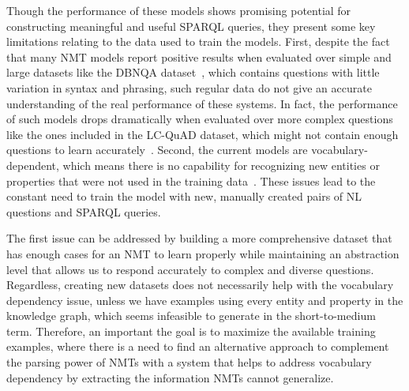 Though the performance of these models shows promising potential for constructing meaningful 
and useful SPARQL queries, they present some key limitations relating to the data 
used to train the models. First, despite the fact that many NMT models report positive results 
when evaluated over simple and large datasets like the DBNQA dataset~\cite{nmt:nl-to-sparql-Yin19}, which 
contains questions with little variation in syntax and phrasing, such regular data do not give an accurate 
understanding of the real performance of these systems. In fact, the performance of such models drops 
dramatically when evaluated over more complex questions like the ones included in the LC-QuAD 
dataset, which might not contain enough questions to learn accurately~\cite{nmt:nl-to-sparql-Yin19}. Second, 
the current models are vocabulary-dependent, which means there is no capability for recognizing 
new entities or properties that were not used in the training data~\cite{nmt:nl-to-sparql-Yin19}. These issues lead 
to the constant need to train the model with new, manually created pairs of NL questions 
and SPARQL queries.

The first issue can be addressed by building a more comprehensive dataset that has enough 
cases for an NMT to learn properly while maintaining an abstraction level that allows us to 
respond accurately to complex and diverse questions. Regardless, creating new datasets does 
not necessarily help with the vocabulary dependency issue, unless we have examples using 
every entity and property in the knowledge graph, which seems infeasible to generate in the 
short-to-medium term. Therefore, an important the goal is to maximize the available training examples, 
where there is a need to find an alternative approach to complement the parsing power 
of NMTs with a system that helps to address vocabulary dependency by extracting the 
information NMTs cannot generalize.

